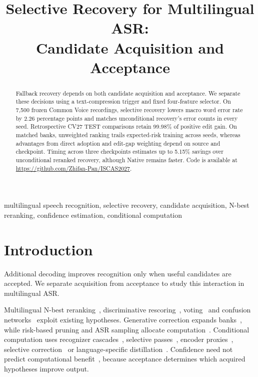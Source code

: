 \documentclass[conference,letterpaper]{IEEEtran}
\title{Selective Recovery for Multilingual ASR:\\Candidate Acquisition and Acceptance}
\begin{document}
\maketitle\flushbottom
\setlength{\parskip}{0pt plus 4pt}
\begin{abstract}
Fallback recovery depends on both candidate acquisition and acceptance. We separate these decisions using a text-compression trigger and fixed four-feature selector. On 7,500 frozen Common Voice recordings, selective recovery lowers macro word error rate by 2.26 percentage points and matches unconditional recovery's error counts in every seed. Retrospective CV27 TEST comparisons retain 99.98\% of positive edit gain. On matched banks, unweighted ranking trails expected-risk training across seeds, whereas advantages from direct adoption and edit-gap weighting depend on source and checkpoint. Timing across three checkpoints estimates up to 5.15\% savings over unconditional reranked recovery, although Native remains faster. Code is available at \url{https://github.com/Zhifan-Pan/ISCAS2027}.
\end{abstract}
\begin{IEEEkeywords}
multilingual speech recognition, selective recovery, candidate acquisition, N-best reranking, confidence estimation, conditional computation
\end{IEEEkeywords}

\section{Introduction}
Additional decoding improves recognition only when useful candidates are accepted. We separate acquisition from acceptance to study this interaction in multilingual ASR.

Multilingual N-best reranking~\cite{gaur2022,yan2025wild}, discriminative rescoring~\cite{rescorebert,discriminative2023,audioattention2019}, voting~\cite{fiscus1997} and confusion networks~\cite{mangu2000} exploit existing hypotheses. Generative correction expands banks~\cite{kuo2026framework,dutta2022,progres2024,whisperingllama}, while risk-based pruning and ASR sampling allocate computation~\cite{cheng2023pruning,jinnai2025mbrasr}. Conditional computation uses recognizer cascades~\cite{xue2025sima}, selective passes~\cite{aleksic2025}, encoder proxies~\cite{fathullah2024proxies}, selective correction~\cite{lim2025hybrid} or language-specific distillation~\cite{ferraz2024distil}. Confidence need not predict computational benefit~\cite{jitkrittum2023cascade}, because acceptance determines which acquired hypotheses improve output.
\end{document}

